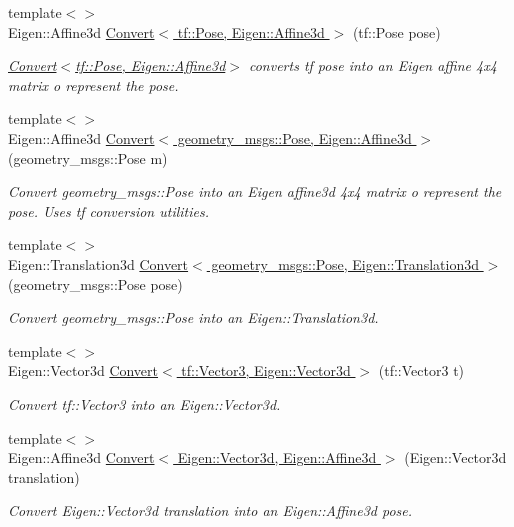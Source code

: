 \begin{DoxyCompactItemize}
{\footnotesize template$<$$>$ }\\Eigen\-::\-Affine3d \hyperlink{namespaceConversion_ab6df3e4febaddcea01517455f251d4c4}{Convert$<$ tf\-::\-Pose, Eigen\-::\-Affine3d $>$} (tf\-::\-Pose pose)
\begin{DoxyCompactList}\small\item\em \hyperlink{namespaceConversion_ac7f0bd2e3357937bb18ca06a40276712}{Convert$<$tf\-::\-Pose, Eigen\-::\-Affine3d$>$} converts tf pose into an Eigen affine 4x4 matrix o represent the pose. \end{DoxyCompactList}\item 
{\footnotesize template$<$$>$ }\\Eigen\-::\-Affine3d \hyperlink{namespaceConversion_af74e38f38df6185e65ff99f74b37f51b}{Convert$<$ geometry\-\_\-msgs\-::\-Pose, Eigen\-::\-Affine3d $>$} (geometry\-\_\-msgs\-::\-Pose m)
\begin{DoxyCompactList}\small\item\em Convert geometry\-\_\-msgs\-::\-Pose into an Eigen affine3d 4x4 matrix o represent the pose. Uses tf conversion utilities. \end{DoxyCompactList}\item 
{\footnotesize template$<$$>$ }\\Eigen\-::\-Translation3d \hyperlink{namespaceConversion_a2898be79c29fac349738d3deb114c139}{Convert$<$ geometry\-\_\-msgs\-::\-Pose, Eigen\-::\-Translation3d $>$} (geometry\-\_\-msgs\-::\-Pose pose)
\begin{DoxyCompactList}\small\item\em Convert geometry\-\_\-msgs\-::\-Pose into an Eigen\-::\-Translation3d. \end{DoxyCompactList}\item 
{\footnotesize template$<$$>$ }\\Eigen\-::\-Vector3d \hyperlink{namespaceConversion_a48211512608db10bf5d310e135f478db}{Convert$<$ tf\-::\-Vector3, Eigen\-::\-Vector3d $>$} (tf\-::\-Vector3 t)
\begin{DoxyCompactList}\small\item\em Convert tf\-::\-Vector3 into an Eigen\-::\-Vector3d. \end{DoxyCompactList}\item 
{\footnotesize template$<$$>$ }\\Eigen\-::\-Affine3d \hyperlink{namespaceConversion_af61bc8900b8c0c7937de965a1af9dd1f}{Convert$<$ Eigen\-::\-Vector3d, Eigen\-::\-Affine3d $>$} (Eigen\-::\-Vector3d translation)
\begin{DoxyCompactList}\small\item\em Convert Eigen\-::\-Vector3d translation into an Eigen\-::\-Affine3d pose. \end{DoxyCompactList}\item 

\end{DoxyCompactItemize}

